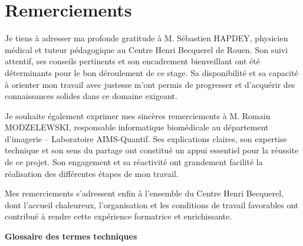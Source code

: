 \documentclass[12pt,a4paper]{report}
\begin{document}


\chapter*{Remerciements}

Je tiens à adresser ma profonde gratitude à M. Sébastien HAPDEY, physicien médical et tuteur pédagogique au Centre Henri Becquerel de Rouen. Son suivi attentif, ses conseils pertinents et son encadrement bienveillant ont été déterminants pour le bon déroulement de ce stage. Sa disponibilité et sa capacité à orienter mon travail avec justesse m'ont permis de progresser et d'acquérir des connaissances solides dans ce domaine exigeant.

Je souhaite également exprimer mes sincères remerciements à M. Romain MODZELEWSKI, responsable informatique biomédicale au département d'imagerie – Laboratoire AIMS-Quantif. Ses explications claires, son expertise technique et son sens du partage ont constitué un appui essentiel pour la réussite de ce projet. Son engagement et sa réactivité ont grandement facilité la réalisation des différentes étapes de mon travail.

Mes remerciements s'adressent enfin à l'ensemble du Centre Henri Becquerel, dont l'accueil chaleureux, l'organisation et les conditions de travail favorables ont contribué à rendre cette expérience formatrice et enrichissante.

\tableofcontents
\newpage

\listoffigures
\newpage

\listoftables

\vspace{1cm}
\begin{center}
\textbf{\large Glossaire des termes techniques}
\end{center}
\vspace{0.5cm}
\end{document}
